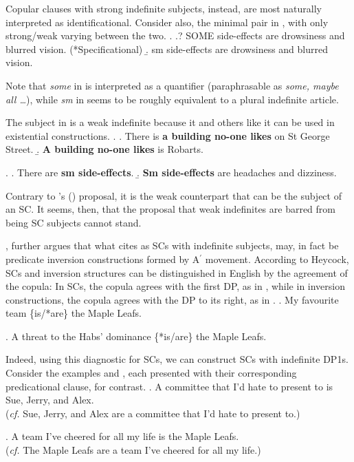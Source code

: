 \documentclass[letterpaper]{article}
\begin{document}
Copular clauses with strong indefinite subjects, instead, are most naturally interpreted as identificational.
Consider also, the minimal pair in \Next, with only strong/weak varying between the two.
\ex.
\a.? SOME side-effects are drowsiness and blurred vision. (*Specificational)
\b. sm side-effects are drowsiness and blurred vision.

Note that \textit{some} in \Last[a] is interpreted as a quantifier (paraphrasable as \textit{some, maybe all \dots}), while \textit{sm} in \Last[b] seems to be roughly equivalent to a plural indefinite article.

The subject in \Last[b] is a weak indefinite because it and others like it can be used in existential constructions.
\ex. 
\a. There is \textbf{a building no-one likes} on St George Street.
\b. \textbf{A building no-one likes} is Robarts.

\ex.
\a. There are \textbf{sm side-effects}.
\b. \textbf{Sm side-effects} are headaches and dizziness. 

Contrary to \citeauthor{heycock2012specification}'s (\citeyear{heycock2012specification}) proposal, it is the weak counterpart that can be the subject of an SC.
It seems, then, that the proposal that weak indefinites are barred from being SC subjects cannot stand.

\textcite{heycock2012specification}, further argues that what \textcite{mikkelsen2005copular} cites as SCs with indefinite subjects, may, in fact be predicate inversion constructions formed by A$^{\prime}$ movement.
According to Heycock, SCs and inversion structures can be distinguished in English by the agreement of the copula:
In SCs, the copula agrees with the first DP, as in \Next, while in inversion constructions, the copula agrees with the DP to its right, as in \NNext.
\ex. My favourite team \{is/*are\} the Maple Leafs.

\ex. A threat to the Habs' dominance \{*is/are\} the Maple Leafs.

Indeed, using this diagnostic for SCs, we can construct SCs with indefinite DP1s.
Consider the examples \Next and \NNext, each presented with their corresponding predicational clause, for contrast.
\ex. A committee that I'd hate to present to is Sue, Jerry, and Alex.\\
(\textit{cf.} Sue, Jerry, and Alex are a committee that I'd hate to present to.)

\ex. A team I've cheered for all my life is the Maple Leafs.\\
(\textit{cf.} The Maple Leafs are a team I've cheered for all my life.)
\end{document}
